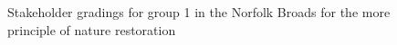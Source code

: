 \documentclass[
  12pt,
  letterpaper,
  DIV=11,
  numbers=noendperiod]{scrartcl}
\begin{document}
\begin{figure}[H]


\caption{\label{fig-BroadsMoreG1}Stakeholder gradings for group 1 in the
Norfolk Broads for the more principle of nature restoration}

\end{figure}%
\end{document}
